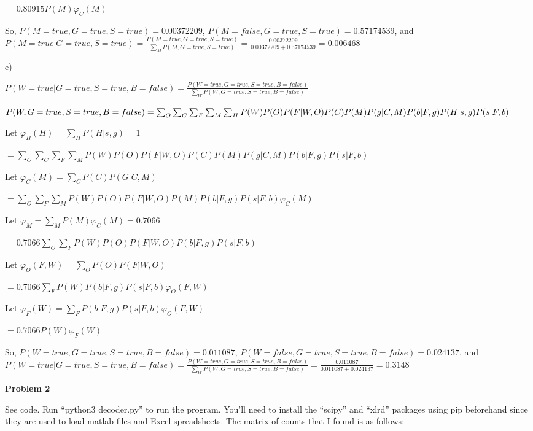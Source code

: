\documentclass[12pt]{article}
\begin{document}
$= 0.80915P(M)\varphi_C(M)$

So, $P(M = true, G = true, S = true) = 0.00372209$, $P(M = false, G = true, S = true) = 0.57174539$, and $P(M = true \vert G = true, S = true) = \frac{P(M = true, G = true, S = true)}{\sum_M P(M, G = true, S = true)} = \frac{0.00372209}{0.00372209 + 0.57174539} = \mathbf{0.006468}$

e) 

$P(W = true \vert G = true, S = true, B = false) = \frac{P(W = true, G = true, S = true, B = false)}{\sum_W P(W, G = true, S = true, B = false)}$

$P(W, G = true, S = true, B = false) = \sum_O\sum_C\sum_F\sum_M\sum_H P(W)P(O)P(F\vert W, O)P(C)P(M)\\P(g \vert C, M)P(b \vert F, g)P(H \vert s, g)P(s \vert F, b)$

Let $\varphi_H(H) = \sum_H P(H \vert s, g) = 1$

$= \sum_O\sum_C\sum_F\sum_M P(W)P(O)P(F\vert W, O)P(C)P(M)P(g \vert C, M)P(b \vert F, g)P(s \vert F, b)$

Let $\varphi_C(M) = \sum_C P(C)P(G \vert C, M)$

$= \sum_O\sum_F\sum_M P(W)P(O)P(F\vert W, O)P(M)P(b \vert F, g)P(s \vert F, b)\varphi_C(M)$

Let $\varphi_M = \sum_M P(M)\varphi_C(M) = 0.7066$

$= 0.7066\sum_O\sum_F P(W)P(O)P(F\vert W, O)P(b \vert F, g)P(s \vert F, b)$

Let $\varphi_O(F, W) = \sum_O P(O)P(F \vert W, O)$

$= 0.7066\sum_F P(W)P(b \vert F, g)P(s \vert F, b)\varphi_O(F, W)$

Let $\varphi_F(W) = \sum_F P(b \vert F, g)P(s \vert F, b)\varphi_O(F, W)$

$= 0.7066P(W)\varphi_F(W)$

So, $P(W = true, G = true, S = true, B = false) = 0.011087$, $P(W = false, G = true, S = true, B = false) = 0.024137$, and $P(W = true \vert G = true, S = true, B = false) = \frac{P(W = true, G = true, S = true, B = false)}{\sum_W P(W, G = true, S = true, B = false)} = \frac{0.011087}{0.011087 + 0.024137} = \mathbf{0.3148}$

\pagebreak\textbf{Problem 2}

See code. Run ``python3 decoder.py'' to run the program. You'll need to install the ``scipy'' and ``xlrd'' packages using pip beforehand since they are used to load matlab files and Excel spreadsheets. The matrix of counts that I found is as follows:
\end{document}
